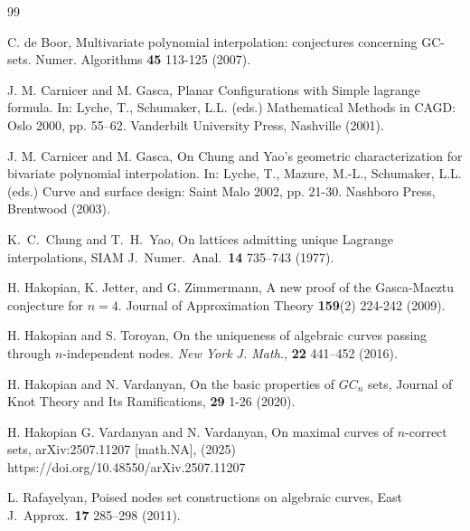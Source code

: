 \documentclass[a4paper,12pt]{article}
\theoremstyle{definition}
\numberwithin{equation}{section}
\numberwithin{figure}{section}
\begin{document}
 \begin{thebibliography}{99}

 {C. de Boor, Multivariate polynomial interpolation: conjectures concerning GC-sets. Numer. Algorithms
{\bf 45} 113-125 (2007).}

J. M. Carnicer and M. Gasca, Planar Configurations with Simple lagrange formula. In: Lyche, T., Schumaker,
L.L. (eds.) Mathematical Methods in CAGD: Oslo 2000, pp. 55–62. Vanderbilt University
Press, Nashville (2001).

J. M. Carnicer and M. Gasca,
{On Chung and Yao's geometric characterization for bivariate polynomial
interpolation}. In: Lyche, T., Mazure, M.-L., Schumaker, L.L. (eds.) Curve and surface design: Saint
Malo 2002, pp. 21-30. Nashboro Press, Brentwood (2003).


K.~C.~Chung and T.~H.~Yao,
{On lattices admitting unique Lagrange interpolations},
SIAM J.\ Numer.\ Anal.\ {\bf 14} 735--743 (1977).


H. Hakopian, K. Jetter, and G. Zimmermann,
A new proof of the
                Gasca-Maeztu conjecture for $n=4.$ Journal of Approximation
                Theory {\bf 159}(2) 224-242 (2009).

H. Hakopian and S. Toroyan, On the uniqueness of algebraic curves passing through  $n$-independent nodes. \textit{New York J. Math.}, {\bf 22} 441--452 (2016).

{H. Hakopian and N. Vardanyan,
On the basic properties of $GC_n$ sets,
Journal of Knot Theory and Its Ramifications,
{\bf 29}  1-26 (2020).}

H. Hakopian G. Vardanyan and N. Vardanyan,
On maximal curves of $n$-correct sets, arXiv:2507.11207 [math.NA], (2025)
https://doi.org/10.48550/arXiv.2507.11207

L. Rafayelyan,
{Poised nodes set constructions on algebraic curves},
East J.\ Approx.\ {\bf 17} 285--298 (2011).

\end{thebibliography}

\end{document}
